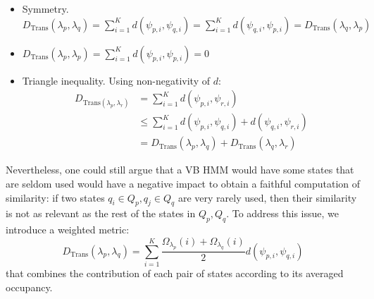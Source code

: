 \documentclass[pdftex,11pt,a4paper]{article}
\theoremstyle{definition}
\theoremstyle{remark}
\begin{document}
\begin{itemize}
\item Symmetry. $D_{\text{Trans}}(\lambda_p, \lambda_q) = \sum_{i=1}^K d(\psi_{p, i}, \psi_{q, i}) = \sum_{i=1}^K d(\psi_{q, i}, \psi_{p, i}) = D_{\text{Trans}}(\lambda_q, \lambda_p)$
\item $D_{\text{Trans}}(\lambda_p, \lambda_p) = \sum_{i=1}^K d(\psi_{p, i}, \psi_{p, i}) = 0$
\item Triangle inequality. Using non-negativity of $d$:
\begin{align*}
D_{\text{Trans}(\lambda_p, \lambda_r)} &= \sum_{i=1}^K d(\psi_{p, i}, \psi_{r, i}) \\
&\leq \sum_{i=1}^K d(\psi_{p, i}, \psi_{q, i}) + d(\psi_{q, i}, \psi_{r, i})\\
&= D_{\text{Trans}}(\lambda_p, \lambda_q) + D_{\text{Trans}}(\lambda_q, \lambda_r)
\end{align*}
\end{itemize}
\par Nevertheless, one could still argue that a VB HMM would have some states that are seldom used would have a negative impact to obtain a faithful computation of similarity: if two states $q_i \in Q_p, q_j \in Q_q$ are very rarely used, then their similarity is not as relevant as the rest of the states in $Q_p, Q_q$. To address this issue, we introduce a weighted metric:
\begin{equation} \label{eq:hmmdist}
D_{\text{Trans}}(\lambda_p, \lambda_q) = \sum_{i=1}^K \frac{\Omega_{\lambda_p}(i) + \Omega_{\lambda_q}(i)}{2} d(\psi_{p, i}, \psi_{q, i})
\end{equation}
that combines the contribution of each pair of states according to its averaged occupancy.
\end{document}
